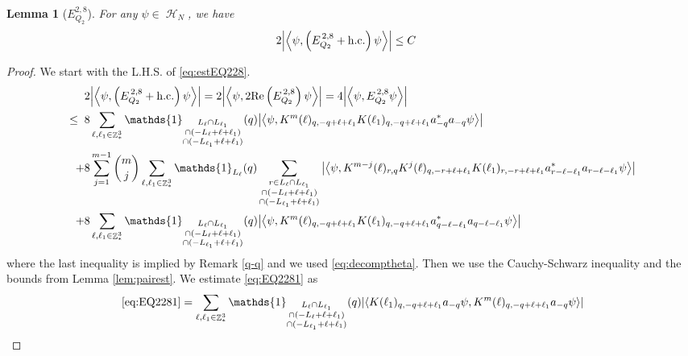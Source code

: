 \documentclass[sn-mathphys, Numbered ,a4paper]{sn-jnl}%
\DeclareMathOperator{\Z}{\mathbb{Z}}
\DeclareMathOperator{\HH}{\mathcal{H}}
\newcommand{\eva}[1]{\left\langle #1 \right\rangle}
\theoremstyle{plain}
\newtheorem{lemma}[theorem]{Lemma}
\theoremstyle{definition}
\theoremstyle{remark}
\theoremstyle{plain}
\theoremstyle{definition}
\theoremstyle{remark}
\begin{document}
\begin{lemma}[$E_{Q_2}^{2,8}$]
For any $\psi \in \HH_N$, we have
\begin{align}
	2\abs{\eva{\psi,\left(E^{\,2,8}_{Q_2}+\mathrm{h.c.}\right) \psi }}
	&\leq  C\,  \label{eq:estEQ228}
	\end{align}
\end{lemma}
\begin{proof}
We start with the L.H.S. of \eqref{eq:estEQ228}.
\begin{align}
	&2\abs{\eva{\psi,\left(E^{\,2,8}_{Q_2}+\mathrm{h.c.}\right) \psi }} = 2\abs{\eva{\psi,2\mathrm{Re}\left(E^{\,2,8}_{Q_2}\right) \psi }} = 4\abs{\eva{\psi, E^{\,2,8}_{Q_2} \psi }}\nonumber\\
	\leq\;\;&8 \sum\limits_{\ell, \ell_1\in \Z^3_*} \mathds{1}_{\substack{L_{\ell}\cap L_{\ell_1}\\\cap (-L_{\ell}+\ell+\ell_1) \\ \cap (-L_{\ell_1}+\ell+\ell_1)}}(q) \abs{\eva{\psi, K^m(\ell)_{q,-q+\ell+\ell_1}K(\ell_1)_{q,-q+\ell+\ell_1} a^*_{-q}a_{-q} \psi}} \label{eq:EQ2281}\\
	\;+&8 \sum\limits_{j=1}^{m-1} {{m}\choose j} \sum\limits_{\ell, \ell_1\in \Z^3_*}\mathds{1}_{L_{\ell}}(q) \sum\limits_{\substack{r\in L_{\ell} \cap L_{\ell_1}\\\cap (-L_{\ell}+\ell+\ell_1) \\ \cap (-L_{\ell_1}+\ell+\ell_1)}}  \abs{\eva{\psi, K^{m-j}(\ell)_{r,q} K^j(\ell)_{q,-r+\ell+\ell_1} K(\ell_1)_{r,-r+\ell+\ell_1} a^*_{r-\ell-\ell_1}a_{r-\ell-\ell_1} \psi }} \label{eq:EQ2282}\\
	\;+&8\sum\limits_{\ell, \ell_1\in \Z^3_*} \mathds{1}_{\substack{L_{\ell}\cap L_{\ell_1}\\\cap (-L_{\ell}+\ell+\ell_1) \\ \cap (-L_{\ell_1}+\ell+\ell_1)}}(q)  \abs{\eva{\psi, K^m(\ell)_{q,-q+\ell+\ell_1} K(\ell_1)_{q,-q+\ell+\ell_1} a^*_{q-\ell-\ell_1}a_{q-\ell-\ell_1} \psi}} \label{eq:EQ2283}
\end{align}
where the last inequality is implied by Remark \ref{q-q} and we used \eqref{eq:decomptheta}. Then we use the Cauchy-Schwarz inequality and the bounds from Lemma \ref{lem:pairest}.
We estimate \eqref{eq:EQ2281} as 
\begin{align}
	\eqref{eq:EQ2281}
	&= \sum\limits_{\ell, \ell_1\in \Z^3_*} \mathds{1}_{\substack{L_{\ell}\cap L_{\ell_1}\\\cap (-L_{\ell}+\ell+\ell_1) \\ \cap (-L_{\ell_1}+\ell+\ell_1)}}(q) \abs{\eva{ K(\ell_1)_{q,-q+\ell+\ell_1} a_{-q} \psi, K^m(\ell)_{q,-q+\ell+\ell_1} a_{-q} \psi }}\nonumber\\

\end{align}
\end{proof}
\end{document}

